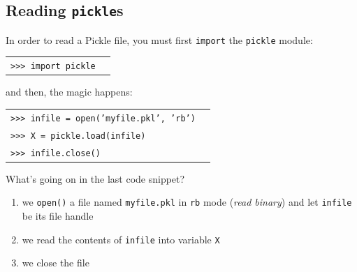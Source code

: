\documentclass[t,handout,9pt]{beamer}
\begin{document}
\subsection{Reading \texttt{pickle}s}
\begin{frame}
\vfill
In order to read a Pickle file, you must first \texttt{import} the \texttt{pickle} module:
\begin{table}[]
\begin{flushleft}
\begin{tabular}{ll}
\texttt{>{}>{}> import pickle} &  \\
\end{tabular}
\end{flushleft}
\end{table}
\vfill
and then, the magic happens:
\begin{table}[]
\begin{flushleft}
\begin{tabular}{ll}
\texttt{>{}>{}> infile = open('myfile.pkl', 'rb')} &  \\
\texttt{>{}>{}> X = pickle.load(infile)} &  \\
\texttt{>{}>{}> infile.close()} &  \\
\end{tabular}
\end{flushleft}
\end{table}
\vfill
What's going on in the last code snippet?
\begin{enumerate}
	\item we \texttt{open()} a file named \texttt{myfile.pkl} in \texttt{rb} mode (\textit{read binary}) and let \texttt{infile} be its file handle
	\item we read the contents of \texttt{infile} into variable \texttt{X}
	\item we close the file
\end{enumerate}
\vfill
\end{frame}
\end{document}

